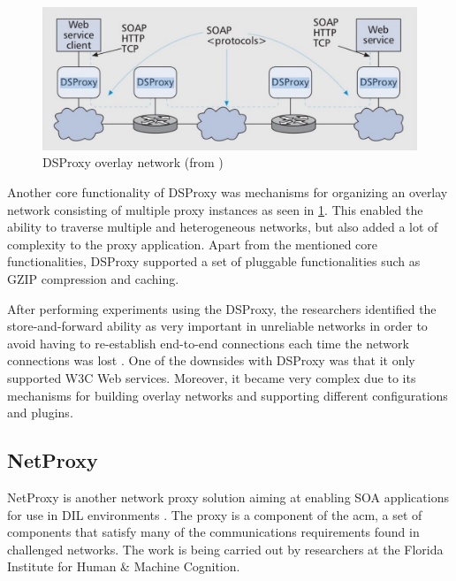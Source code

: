 \begin{figure}[h]
\includegraphics[scale=0.35]{images/dsproxy.pdf}
\caption{DSProxy overlay network (from \cite{ieee-dsproxy} )}
\label{figure:dsproxy}
\end{figure}

Another core functionality of DSProxy was mechanisms for organizing an overlay
network consisting of multiple proxy instances as seen in \cref{figure:dsproxy}.
This enabled the ability to traverse multiple and heterogeneous networks, but
also added a lot of complexity to the proxy application. Apart from the
mentioned core functionalities, DSProxy supported a set of pluggable
functionalities such as GZIP compression and caching.

After performing experiments using the DSProxy, the researchers identified the
store-and-forward ability as very important in unreliable networks in order to
avoid having to re-establish end-to-end connections each time the network
connections was lost \cite{dsproxy-ffi}. One of the downsides with DSProxy was
that it only supported W3C Web services. Moreover, it became very complex due to
its mechanisms for building overlay networks and supporting different
configurations and plugins.

\subsection{NetProxy}

NetProxy is another network proxy solution aiming at enabling SOA applications
for use in DIL environments \cite{suri-netproxy}. The proxy is a component of
the \gls{acm}, a set of components that satisfy many of the communications
requirements found in challenged networks. The work is being carried out by
researchers at the Florida Institute for Human \& Machine Cognition.


